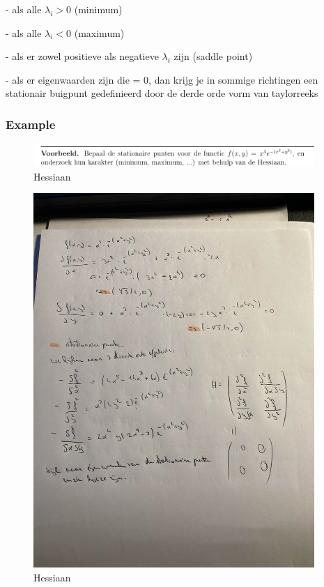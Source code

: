\documentclass[a4paper]{report}
\begin{document}
- als alle $\lambda_i > 0$ (minimum)

- als alle $\lambda_i < 0$ (maximum)

- als er zowel positieve als negatieve $\lambda_i$ zijn (saddle point)

- als er eigenwaarden zijn die = 0, dan krijg je in sommige richtingen een stationair buigpunt gedefinieerd door de derde orde vorm van taylorreeks

\subsubsection{Example}

\begin{figure}[H]
	\begin{center}
		\includegraphics[width=0.95\textwidth]{./images/hessian_ex.png}
	\end{center}
	\caption{Hessiaan}
	\label{}
\end{figure}

\begin{figure}[H]
	\begin{center}
		\includegraphics[width=0.95\textwidth]{./images/hessian_my.jpg}
	\end{center}
	\caption{Hessiaan}
	\label{}
\end{figure}
\end{document}
